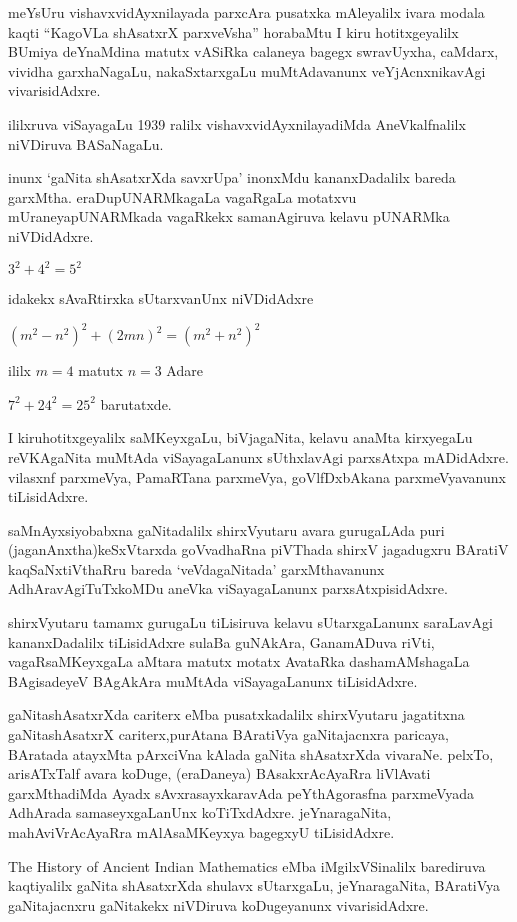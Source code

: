 meYsUru vishavxvidAyxnilayada parxcAra pusatxka mAleyalilx ivara modala kaqti ``KagoVLa shAsatxrX parxveVsha'' horabaMtu I kiru hotitxgeyalilx BUmiya deYnaM\-dina matutx vASiRka calaneya bagegx swravUyxha, caMdarx, vividha garxhaNagaLu, nakaSxtarxgaLu muMtAda\-vanunx veYjAcnxnikavAgi vivarisidAdxre.

ililxruva viSayagaLu {\rm 1939} ralilx vishavxvidAyxnilayadiMda AneVkalfnalilx niVDiruva BASaNagaLu.

inunx `gaNita shAsatxrXda savxrUpa' inonxMdu kananxDadalilx bareda garxMtha. eraDu\break pUNARMkagaLa vagaRgaLa motatxvu mUraneyapUNARMkada vagaRkekx samanAgiruva kelavu pUNARMka niVDidAdxre.
\begin{center}
$3^2+4^2=5^2$

idakekx sAvaRtirxka sUtarxvanUnx niVDidAdxre

$(m^2-n^2)^2+(2mn)^2=(m^2+n^2)^2$

ililx $m=4$ matutx $n=3$ Adare

$7^2+24^{2}=25^2$ barutatxde.
\end{center}
I kiruhotitxgeyalilx saMKeyxgaLu, biVjagaNita, kelavu anaMta kirxyegaLu reVKAgaNita muMtAda viSayagaLanunx sUthxlavAgi parxsAtxpa mADidAdxre. vilasxnf parxmeVya, PamaRTana parxmeVya, goVlfDxbAkana parxmeVyavanunx tiLisidAdxre.

saMnAyxsiyobabxna gaNitadalilx shirxVyutaru avara gurugaLAda puri (jaganAnxtha)\break keSxVtarxda goVvadhaRna piVThada shirxV jagadugxru BAratiV kaqSaNxtiVthaRru bareda `veVdagaNitada' garxMthavanunx AdhAravAgiTuTxkoMDu aneVka viSayagaLanunx parxsAtxpisidAdxre.

shirxVyutaru tamamx gurugaLu tiLisiruva kelavu sUtarxgaLanunx saraLavAgi kananxDadalilx tiLisidAdxre sulaBa guNAkAra, GanamADuva riVti, vagaRsaMKeyxgaLa aMtara matutx motatx AvataRka dashamAMshagaLa BAgisadeyeV BAgAkAra muMtAda viSayagaLanunx tiLisidAdxre.

gaNitashAsatxrXda cariterx eMba pusatxkadalilx shirxVyutaru jagatitxna gaNitashAsatxrX cariterx,\break purAtana BAratiVya gaNitajacnxra paricaya, BAratada atayxMta pArxciVna kAlada gaNita shAsatxrXda vivaraNe. pelxTo, arisATxTalf avara koDuge, (eraDaneya) BAsakxrAcAyaRra liVlAvati garxMthadiMda Ayadx sAvxrasayxkaravAda peYthAgorasfna parxmeVyada AdhArada samaseyx\-gaLanUnx koTiTxdAdxre. jeYnaragaNita, mahAviVrAcAyaRra mAlAsaMKeyxya bagegxyU tiLisidAdxre.

{\rm The History of Ancient Indian Mathematics} eMba iMgilxVSinalilx barediruva kaqtiyalilx gaNita shAsatxrXda shulavx sUtarxgaLu, jeYnaragaNita, BAratiVya gaNitajacnxru gaNitakekx niVDiruva koDugeyanunx vivarisidAdxre.

